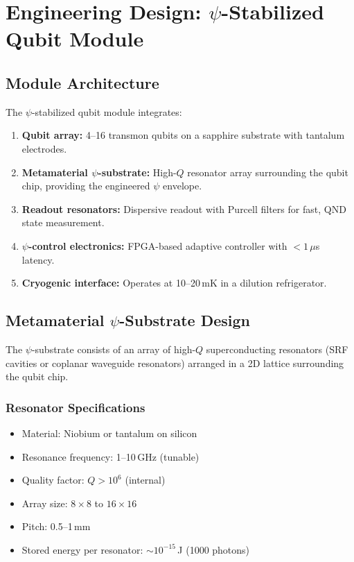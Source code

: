 \documentclass[aps,prd,twocolumn,superscriptaddress,nofootinbib]{revtex4-2}
\begin{document}
\section{Engineering Design: $\psi$-Stabilized Qubit Module}
\label{sec:engineering}

\subsection{Module Architecture}

The $\psi$-stabilized qubit module integrates:

\begin{enumerate}
\item \textbf{Qubit array:} 4--16 transmon qubits on a sapphire
substrate with tantalum electrodes.
\item \textbf{Metamaterial $\psi$-substrate:} High-$Q$ resonator array
surrounding the qubit chip, providing the engineered $\psi$ envelope.
\item \textbf{Readout resonators:} Dispersive readout with Purcell
filters for fast, QND state measurement.
\item \textbf{$\psi$-control electronics:} FPGA-based adaptive controller
with $<1\,\mu$s latency.
\item \textbf{Cryogenic interface:} Operates at 10--20\,mK in a dilution
refrigerator.
\end{enumerate}

\subsection{Metamaterial $\psi$-Substrate Design}

The $\psi$-substrate consists of an array of high-$Q$ superconducting
resonators (SRF cavities or coplanar waveguide resonators) arranged in a
2D lattice surrounding the qubit chip.

\subsubsection{Resonator Specifications}
\begin{itemize}
\item Material: Niobium or tantalum on silicon
\item Resonance frequency: 1--10\,GHz (tunable)
\item Quality factor: $Q > 10^6$ (internal)
\item Array size: $8 \times 8$ to $16 \times 16$
\item Pitch: 0.5--1\,mm
\item Stored energy per resonator: $\sim 10^{-15}$\,J (1000 photons)
\end{itemize}
\end{document}
